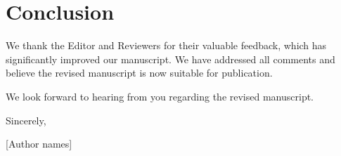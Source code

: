 
\noindent\hrulefill

\section*{Conclusion}

We thank the Editor and Reviewers for their valuable feedback, which has significantly improved our manuscript. We have addressed all comments and believe the revised manuscript is now suitable for publication.

We look forward to hearing from you regarding the revised manuscript.

Sincerely,

[Author names]

